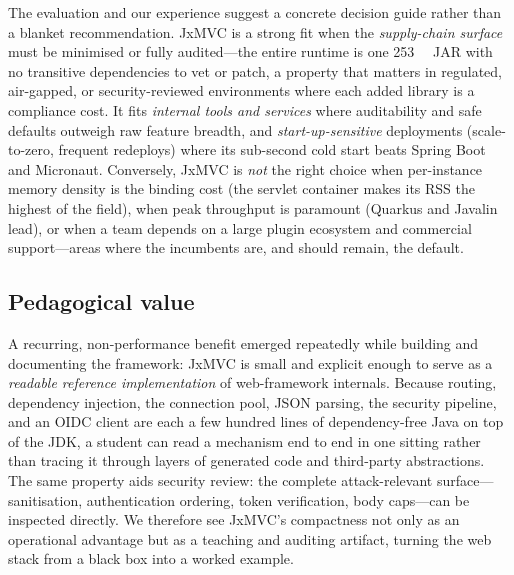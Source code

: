 The evaluation and our experience suggest a concrete decision guide
rather than a blanket recommendation. JxMVC is a strong fit when the
\emph{supply-chain surface} must be minimised or fully audited---the
entire runtime is one \SI{253}{\kilo\byte} JAR with no transitive
dependencies to vet or patch, a property that matters in regulated,
air-gapped, or security-reviewed environments where each added library
is a compliance cost. It fits \emph{internal tools and services} where
auditability and safe defaults outweigh raw feature breadth, and
\emph{start-up-sensitive} deployments (scale-to-zero, frequent
redeploys) where its sub-second cold start beats Spring Boot and
Micronaut. Conversely, JxMVC is \emph{not} the right choice when
per-instance memory density is the binding cost (the servlet container
makes its RSS the highest of the field), when peak throughput is
paramount (Quarkus and Javalin lead), or when a team depends on a large
plugin ecosystem and commercial support---areas where the incumbents
are, and should remain, the default.

\subsection{Pedagogical value}

A recurring, non-performance benefit emerged repeatedly while building
and documenting the framework: JxMVC is small and explicit enough to
serve as a \emph{readable reference implementation} of web-framework
internals. Because routing, dependency injection, the connection pool,
JSON parsing, the security pipeline, and an OIDC client are each a few
hundred lines of dependency-free Java on top of the JDK, a student can
read a mechanism end to end in one sitting rather than tracing it
through layers of generated code and third-party abstractions. The
same property aids security review: the complete attack-relevant
surface---sanitisation, authentication ordering, token verification,
body caps---can be inspected directly. We therefore see JxMVC's
compactness not only as an operational advantage but as a teaching and
auditing artifact, turning the web stack from a black box into a worked
example.
